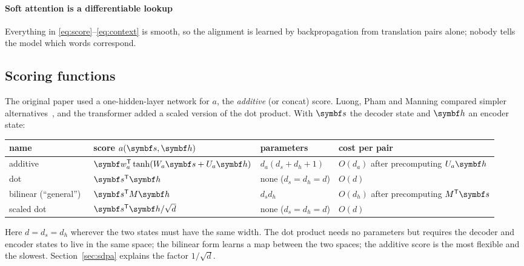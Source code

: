 \documentclass[11pt]{article}
\newcommand{\hv}{\vect{h}}
\newcommand{\sv}{\vect{s}}
\begin{document}
\paragraph{Soft attention is a differentiable lookup} Everything in \eqref{eq:score}--\eqref{eq:context} is smooth, so the
alignment is learned by backpropagation from translation pairs alone; nobody tells the model which words correspond.

\subsection{Scoring functions}\label{sec:scores}

The original paper used a one-hidden-layer network for $a$, the \emph{additive} (or concat) score. Luong, Pham and
Manning compared simpler alternatives~\cite{luong2015}, and the transformer added a scaled version of the dot product. With
$\sv$ the decoder state and $\hv$ an encoder state:
\begin{center}\small
\begin{tabular}{@{}llll@{}}
\toprule
name & score $a(\sv, \hv)$ & parameters & cost per pair \\
\midrule
additive~\cite{bahdanau2015} & $\vect{w}_a\T\tanh(W_a\sv + U_a\hv)$ & $d_a(d_s + d_h + 1)$ & $O(d_a)$ after precomputing $U_a\hv$ \\
dot~\cite{luong2015} & $\sv\T\hv$ & none ($d_s = d_h = d$) & $O(d)$ \\
bilinear (``general'')~\cite{luong2015} & $\sv\T M\hv$ & $d_sd_h$ & $O(d_h)$ after precomputing $M\T\sv$ \\
scaled dot~\cite{vaswani2017} & $\sv\T\hv/\sqrt{d}$ & none ($d_s = d_h = d$) & $O(d)$ \\
\bottomrule
\end{tabular}
\end{center}
Here $d = d_s = d_h$ wherever the two states must have the same width. The dot product needs no parameters but requires the decoder and encoder states to live in the same space; the bilinear
form learns a map between the two spaces; the additive score is the most flexible and the slowest. Section~\ref{sec:sdpa}
explains the factor $1/\sqrt{d}$.
\end{document}
